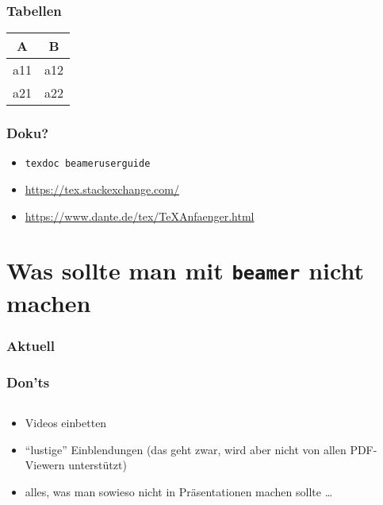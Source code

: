 \documentclass{beamer}
\begin{document}
\begin{frame}
  \frametitle{Tabellen}
  \begin{tabular}{|c|c|}\hline
   A & B \\ \hline
   a11 & a12 \\ \hline
   a21 & a22 \\ \hline
 \end{tabular}
\end{frame}

\begin{frame}[fragile]
  \frametitle{Doku?}

  \onslide<+->

  \begin{itemize}
  \item \verb!texdoc beameruserguide!
  \item \url{https://tex.stackexchange.com/}
  \item \url{https://www.dante.de/tex/TeXAnfaenger.html}
  \end{itemize}

\end{frame}

\section{Was sollte man mit \texttt{beamer} nicht machen}

\begin{frame}
  \frametitle{Aktuell}
  \tableofcontents[currentsection]{}
\end{frame}

\begin{frame}
  \frametitle{Don'ts}

  \begin{columns}
    \begin{column}{0.45\linewidth}

  \begin{itemize}
  \item<+-> Videos einbetten
  \item<+-> \enquote{lustige} Einblendungen (das geht zwar, wird aber nicht von
    allen PDF-Viewern unterstützt)
  \item<+-> alles, was man sowieso nicht in Präsentationen machen sollte \ldots
  \end{itemize}

    \end{column}
    \begin{column}{0.45\linewidth}
    \end{column}
  \end{columns}

\end{frame}
\end{document}
